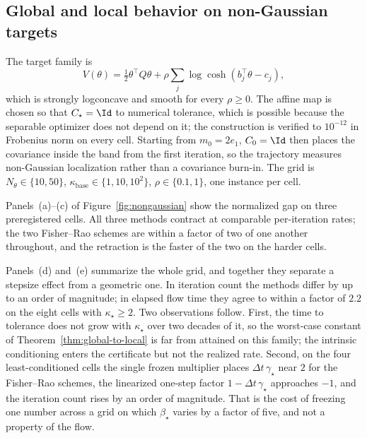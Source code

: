\subsection{Global and local behavior on non-Gaussian targets}
\label{subsec:numerics-nongaussian}

The target family is
\[
    V(\theta)
    =
    \tfrac12\theta^{\!\top}Q\theta
    +
    \rho\sum_j\log\cosh(b_j^{\!\top}\theta-c_j),
\]
which is strongly logconcave and smooth for every $\rho\geq0$. The affine map is
chosen so that $C_\star=\Id$ to numerical tolerance, which is possible because the
separable optimizer does not depend on it; the construction is verified to
$10^{-12}$ in Frobenius norm on every cell. Starting from $m_0=2e_1$, $C_0=\Id$ then places
the covariance inside the band from the first iteration, so the trajectory
measures non-Gaussian localization rather than a covariance burn-in. The grid is
$N_\theta\in\{10,50\}$, $\kappa_{\mathrm{base}}\in\{1,10,10^2\}$,
$\rho\in\{0.1,1\}$, one instance per cell.

Panels~(a)--(c) of Figure~\ref{fig:nongaussian} show the normalized gap on three
preregistered cells. All three methods contract at comparable per-iteration
rates; the two Fisher--Rao schemes are within a factor of two of one another
throughout, and the retraction is the faster of the two on the harder cells.

Panels~(d) and~(e) summarize the whole grid, and together they separate a
stepsize effect from a geometric one. In iteration count the methods differ by up
to an order of magnitude; in elapsed flow time they agree to within a factor of
$2.2$ on the eight cells with $\kappa_\star\geq2$. Two observations follow. First,
the time to tolerance does not grow with $\kappa_\star$ over two decades of it, so
the worst-case constant of Theorem~\ref{thm:global-to-local} is far from attained
on this family; the intrinsic conditioning enters the certificate but not the
realized rate. Second, on the four least-conditioned cells the single frozen
multiplier places $\Delta t\,\gamma_\star$ near $2$ for the Fisher--Rao schemes,
the linearized one-step factor $1-\Delta t\,\gamma_\star$ approaches $-1$, and the
iteration count rises by an order of magnitude. That is the cost of freezing one
number across a grid on which $\beta_\star$ varies by a factor of five, and not a
property of the flow.


